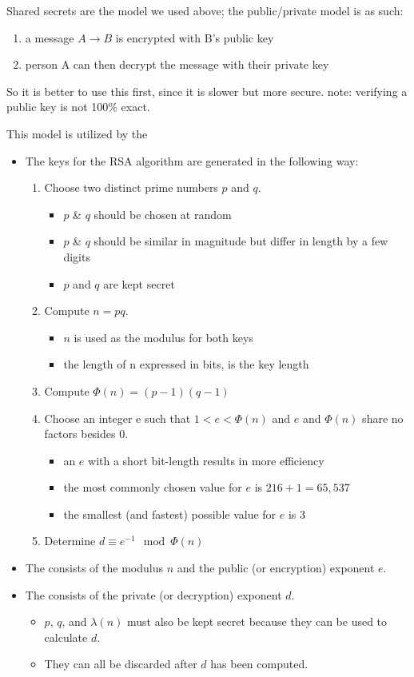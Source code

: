 \documentclass[../../lecture_notes.tex]{subfiles}
\begin{document}
Shared secrets are the model we used above; the public/private model is as such:
\begin{enumerate}[nosep]
\item a message $A \to B$ is encrypted with B’s public key
\item person A can then decrypt the message with their private key
\end{enumerate}

So it is better to use this first, since it is slower but more secure. note: verifying a public key is not 100\% exact.

This model is utilized by the 
\begin{itemize}
	\item The keys for the RSA algorithm are generated in the following way:
		\begin{enumerate}[nosep]
			\item Choose two distinct prime numbers $p$ and $q$.
				\begin{itemize}
					\item $p$ \& $q$ should be chosen at random
					\item $p$ \& $q$ should be similar in magnitude but differ in length by a few digits 
					\item $p$ and $q$ are kept secret
				\end{itemize}
			\item Compute $n = pq$.
				\begin{itemize}
					\item $n$ is used as the modulus for both keys
					\item the length of n expressed in bits, is the key length
				\end{itemize}
			\item Compute $\Phi(n) = (p - 1) (q - 1)$
			\item Choose an integer e such that $1 < e <\Phi(n)$ and $e$ and $\Phi(n)$ share no factors besides 0.
				\begin{itemize}
					\item an $e$ with a short bit-length results in more efficiency
					\item the most commonly chosen value for $e$ is $216 + 1 = 65,537$
					\item the smallest (and fastest) possible value for $e$ is 3
				\end{itemize}
			\item Determine $d \equiv e^{-1}\mod\Phi(n)$
		\end{enumerate}
	\item The  consists of the modulus $n$ and the public (or encryption) exponent $e$.
	\item The  consists of the private (or decryption) exponent $d$.
		\begin{itemize}
			\item $p$, $q$, and $\lambda(n)$ must also be kept secret because they can be used to calculate $d$. 	
			\item They can all be discarded after $d$ has been computed.
		\end{itemize}
\end{itemize}
\end{document}
